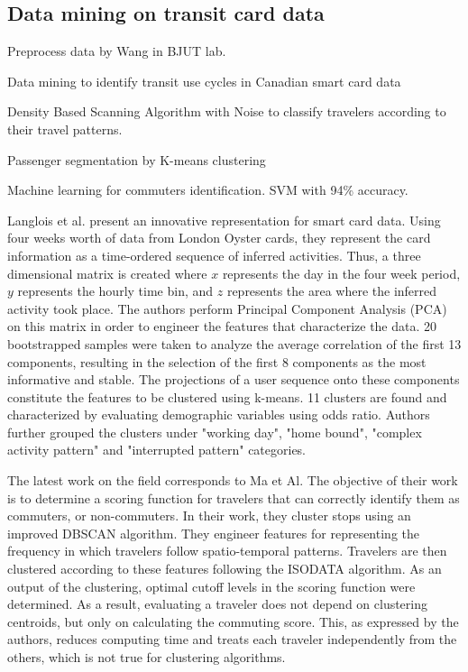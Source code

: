 \documentclass{article}
\begin{document}
\subsection{Data mining on transit card data}
Preprocess data by Wang in BJUT lab. \cite{wang2014research}

Data mining to identify transit use cycles in Canadian smart card data \cite{morency2007measuring}

Density Based Scanning Algorithm with Noise to classify travelers according to their travel patterns.  \cite{ma2013mining}

Passenger segmentation by K-means clustering \cite{bhaskar2015passenger}

Machine learning for commuters identification. SVM with 94\% accuracy. \cite{tu2016impact}

Langlois et al. \cite{langlois2016inferring} present an innovative representation for smart card data. Using four weeks worth of data from London Oyster cards, they represent the card information as a time-ordered sequence of inferred activities. Thus, a three dimensional matrix is created where $x$ represents the day in the four week period, $y$ represents the hourly time bin, and $z$ represents the area where the inferred activity took place. The authors perform Principal Component Analysis (PCA) on this matrix in order to engineer the features that characterize the data. 20 bootstrapped samples were taken to analyze the average correlation of the first 13 components, resulting in the selection of the first 8 components as the most informative and stable. The projections of a user sequence onto these components constitute the features to be clustered using k-means. 11 clusters are found and characterized by evaluating demographic variables using odds ratio. Authors further grouped the clusters under "working day", "home bound", "complex activity pattern" and "interrupted pattern" categories. 

The latest work on the field corresponds to Ma et Al. \cite{ma2017understanding} The objective of their work is to determine a scoring function for travelers that can correctly identify them as commuters, or non-commuters. In their work, they cluster stops using an improved DBSCAN algorithm. They engineer features for representing the frequency in which travelers follow spatio-temporal patterns. Travelers are then clustered according to these features following the ISODATA algorithm. As an output of the clustering, optimal cutoff levels in the scoring function were determined. As a result, evaluating a traveler does not depend on clustering centroids, but only on calculating the commuting score. This, as expressed by the authors, reduces computing time and treats each traveler independently from the others, which is not true for clustering algorithms.
\end{document}
